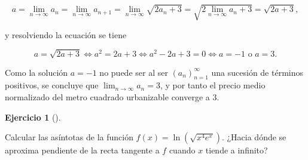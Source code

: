 \documentclass[
  spanish,
  a4paper,
]{scrreport}
\theoremstyle{definition}
\newtheorem{exercise}{Ejercicio}[chapter]
\theoremstyle{remark}
\begin{document}
\begin{tcolorbox}
\[
a 
= \lim_{n\to\infty} a_n 
= \lim_{n\to\infty} a_{n+1} 
= \lim_{n\to\infty} \sqrt{2a_n+3} 
= \sqrt{2\lim_{n\to\infty} a_n + 3}
= \sqrt{2a+3},
\]

y resolviendo la ecuación se tiene

\[
a = \sqrt{2a+3} 
\Leftrightarrow a^2 = 2a+3
\Leftrightarrow a^2-2a+3 = 0
\Leftrightarrow a = -1 \mbox{ o } a = 3.
\]

Como la solución \(a=-1\) no puede ser al ser \((a_n)_{n=1}^\infty\) una
sucesión de términos positivos, se concluye que
\(\lim_{n\to\infty} a_n = 3\), y por tanto el precio medio normalizado
del metro cuadrado urbanizable converge a \(3\).

\end{tcolorbox}

\begin{exercise}[]\protect\hypertarget{exr-3}{}\label{exr-3}

Calcular las asíntotas de la función \(f(x) = \ln(\sqrt{x^4e^x})\).
¿Hacia dónde se aproxima pendiente de la recta tangente a \(f\) cuando
\(x\) tiende a infinito?

\end{exercise}
\end{document}
